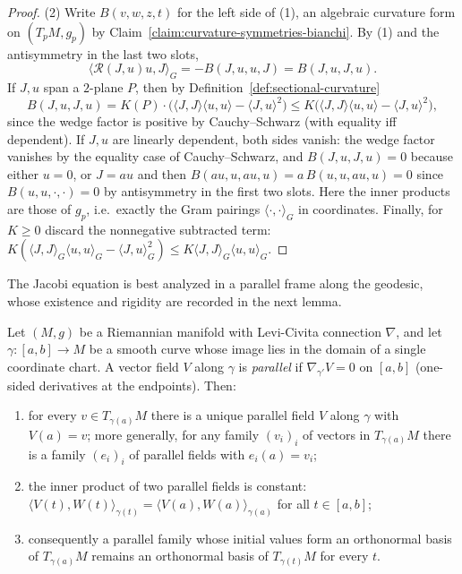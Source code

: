 \begin{proof}
(2) Write $B(v,w,z,t)$ for the left side of (1), an algebraic
curvature form on $(T_pM,g_p)$ by
Claim~\ref{claim:curvature-symmetries-bianchi}. By (1) and the
antisymmetry in the last two slots,
$$\langle{\mathcal R}(J,u)u,J\rangle_G=-B(J,u,u,J)=B(J,u,J,u).$$
If $J,u$ span a $2$-plane $P$, then by
Definition~\ref{def:sectional-curvature}
$$B(J,u,J,u)=K(P)\cdot
\bigl(\langle J,J\rangle\langle u,u\rangle-\langle J,u\rangle^2\bigr)
\le K\bigl(\langle J,J\rangle\langle u,u\rangle
-\langle J,u\rangle^2\bigr),$$
since the wedge factor is positive by Cauchy--Schwarz (with equality
iff dependent). If $J,u$ are linearly dependent, both sides vanish:
the wedge factor vanishes by the equality case of Cauchy--Schwarz,
and $B(J,u,J,u)=0$ because either $u=0$, or $J=au$ and then
$B(au,u,au,u)=a\,B(u,u,au,u)=0$ since $B(u,u,\cdot,\cdot)=0$ by
antisymmetry in the first two slots. Here the inner products are
those of $g_p$, i.e.\ exactly the Gram pairings
$\langle\cdot,\cdot\rangle_G$ in coordinates. Finally, for $K\ge0$
discard the nonnegative subtracted term:
$K(\langle J,J\rangle_G\langle u,u\rangle_G-\langle J,u\rangle_G^2)
\le K\langle J,J\rangle_G\langle u,u\rangle_G$.
\end{proof}

The Jacobi equation is best analyzed in a parallel frame along the
geodesic, whose existence and rigidity are recorded in the next
lemma.

\begin{lemma}
\label{lem:parallel-frame}
\leanok
Let $(M,g)$ be a Riemannian manifold with Levi-Civita connection
$\nabla$, and let $\gamma\colon[a,b]\to M$ be a smooth curve whose
image lies in the domain of a single coordinate chart. A vector field
$V$ along $\gamma$ is {\em parallel} if $\nabla_{\gamma'}V=0$ on
$[a,b]$ (one-sided derivatives at the endpoints). Then:
\begin{enumerate}
\item for every $v\in T_{\gamma(a)}M$ there is a unique parallel
field $V$ along $\gamma$ with $V(a)=v$; more generally, for any
family $(v_i)_i$ of vectors in $T_{\gamma(a)}M$ there is a family
$(e_i)_i$ of parallel fields with $e_i(a)=v_i$;
\item the inner product of two parallel fields is constant:
$\langle V(t),W(t)\rangle_{\gamma(t)}
=\langle V(a),W(a)\rangle_{\gamma(a)}$ for all $t\in[a,b]$;
\item consequently a parallel family whose initial values form an
orthonormal basis of $T_{\gamma(a)}M$ remains an orthonormal basis
of $T_{\gamma(t)}M$ for every $t$.
\end{enumerate}
\end{lemma}

